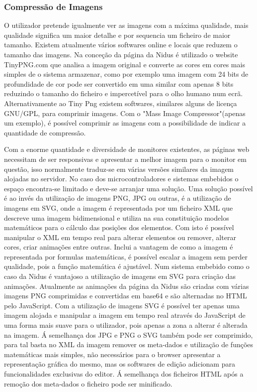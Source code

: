 \subsubsection{Compressão de Imagens}
\par

O utilizador pretende igualmente ver as imagens com a máxima qualidade, mais qualidade significa um maior detalhe e por sequencia um ficheiro de maior tamanho. Existem atualmente vários softwares online e locais que reduzem o tamanho das imagens. Na conceção da página da Nidus é utilizado o website TinyPNG.com que analisa a imagem original e converte as cores em cores mais simples de o sistema armazenar, como por exemplo uma imagem com 24 bits de profundidade de cor pode ser convertido em uma similar com apenas 8 bits reduzindo o tamanho do ficheiro e impercetível para o olho humano num ecrã\cite{Hilles2019}. Alternativamente ao Tiny Png existem softwares, similares alguns de licença GNU/GPL, para comprimir imagens. Com o "Mass Image Compressor"\cite{Mass_Image_Compressor}(apenas um exemplo), é possível comprimir as imagens com a possibilidade de indicar a quantidade de compressão.
\par
Com a enorme quantidade e diversidade de monitores existentes, as páginas web necessitam de ser responsivas e apresentar a melhor imagem para o monitor em questão, isso normalmente traduz-se em várias versões similares da imagem alojadas no servidor. No caso dos microcontroladores e sistemas embebidos o espaço encontra-se limitado e deve-se arranjar uma solução. Uma solução possível é ao invés da utilização de imagens PNG, JPG ou outras, é a utilização de imagens em SVG, onde a imagem é representada por um ficheiro XML que descreve uma imagem bidimensional e utiliza na sua constituição modelos matemáticos para o cálculo das posições dos elementos. Com isto é possível manipular o XML em tempo real para alterar elementos ou remover, alterar cores, criar animações entre outras. Inclui a vantagem de como a imagem é representada por formulas matemáticas, é possível escalar a imagem sem perder qualidade, pois a função matemática é ajustável. Num sistema embebido como o caso da Nidus é vantajoso a utilização de imagens em SVG para criação das animações. Atualmente as animações da página da Nidus são criadas com várias imagens PNG comprimidas e convertidas em base64 e são alternadas no HTML pelo JavaScript. Com a utilização de imagens SVG é possível ter apenas uma imagem alojada e manipular a imagem em tempo real através do JavaScript de uma forma mais suave para o utilizador, pois apenas a zona a alterar é alterada na imagem.
Á semelhança dos JPG e PNG o SVG também pode ser comprimido, para tal basta no XML da imagem remover os meta-dados  e utilização de funções matemáticas mais simples, não necessários para o browser apresentar a representação gráfica do mesmo, mas os softwares de edição adicionam para funcionalidades exclusivas do editor. Á semelhança dos ficheiros HTML após a remoção dos meta-dados o ficheiro pode ser minificado.

